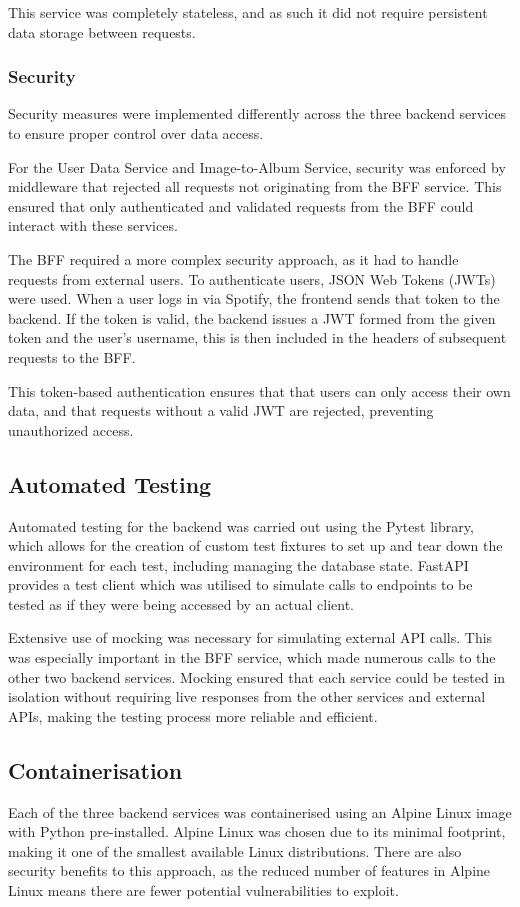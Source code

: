 This service was completely stateless, and as such it did not require persistent data storage between requests.

\subsubsection{Security}
Security measures were implemented differently across the three backend services to ensure proper control over data access.

For the User Data Service and Image-to-Album Service, security was enforced by middleware that rejected all requests not originating from the BFF service. This ensured that only authenticated and validated requests from the BFF could interact with these services.

The BFF required a more complex security approach, as it had to handle requests from external users. To authenticate users, JSON Web Tokens (JWTs) were used. When a user logs in via Spotify, the frontend sends that token to the backend. If the token is valid, the backend issues a JWT formed from the given token and the user's username, this is then included in the headers of subsequent requests to the BFF.

This token-based authentication ensures that that users can only access their own data, and that requests without a valid JWT are rejected, preventing unauthorized access.

\subsection{Automated Testing}
Automated testing for the backend was carried out using the Pytest library, which allows for the creation of custom test fixtures to set up and tear down the environment for each test, including managing the database state. FastAPI provides a test client which was utilised to simulate calls to endpoints to be tested as if they were being accessed by an actual client.

Extensive use of mocking was necessary for simulating external API calls. This was especially important in the BFF service, which made numerous calls to the other two backend services. Mocking ensured that each service could be tested in isolation without requiring live responses from the other services and  external APIs, making the testing process more reliable and efficient.

\subsection{Containerisation}
Each of the three backend services was containerised using an Alpine Linux image with Python pre-installed. Alpine Linux was chosen due to its minimal footprint, making it one of the smallest available Linux distributions. There are also security benefits to this approach, as the reduced number of features in Alpine Linux means there are fewer potential vulnerabilities to exploit.

